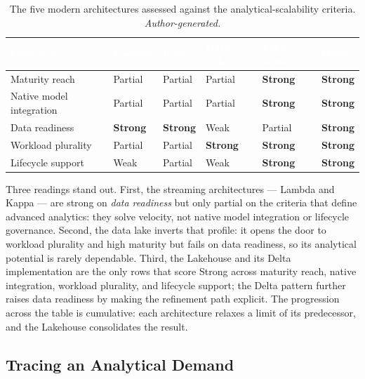 \begin{table}[H]
\centering
\renewcommand{\arraystretch}{1.35}
\caption{The five modern architectures assessed against the analytical-scalability criteria. \textit{Author-generated.}}
\label{tab:ch2-comparison}
\begin{tabularx}{\linewidth}{|>{\raggedright\arraybackslash}p{3.3cm}|>{\centering\arraybackslash}X|>{\centering\arraybackslash}X|>{\centering\arraybackslash}X|>{\centering\arraybackslash}X|>{\centering\arraybackslash}X|}
\hline
\rowcolor{tblheader}
\textcolor{white}{\textbf{Criterion}} &
\textcolor{white}{\textbf{Lambda}} &
\textcolor{white}{\textbf{Kappa}} &
\textcolor{white}{\textbf{Data Lake}} &
\textcolor{white}{\textbf{Lake-house}} &
\textcolor{white}{\textbf{Delta}} \\
\hline
Maturity reach & Partial & Partial & Partial & \textbf{Strong} & \textbf{Strong} \\
Native model integration & Partial & Partial & Partial & \textbf{Strong} & \textbf{Strong} \\
Data readiness & \textbf{Strong} & \textbf{Strong} & Weak & Partial & \textbf{Strong} \\
Workload plurality & Partial & Partial & \textbf{Strong} & \textbf{Strong} & \textbf{Strong} \\
Lifecycle support & Weak & Partial & Weak & \textbf{Strong} & \textbf{Strong} \\
\hline
\end{tabularx}
\end{table}

Three readings stand out. First, the streaming architectures --- Lambda and Kappa --- are strong on \textit{data readiness} but only partial on the criteria that define advanced analytics: they solve velocity, not native model integration or lifecycle governance. Second, the data lake inverts that profile: it opens the door to workload plurality and high maturity but fails on data readiness, so its analytical potential is rarely dependable. Third, the Lakehouse and its Delta implementation are the only rows that score Strong across maturity reach, native integration, workload plurality, and lifecycle support; the Delta pattern further raises data readiness by making the refinement path explicit. The progression across the table is cumulative: each architecture relaxes a limit of its predecessor, and the Lakehouse consolidates the result.

\subsection{Tracing an Analytical Demand}
\label{subsec:ch2-tracing}

